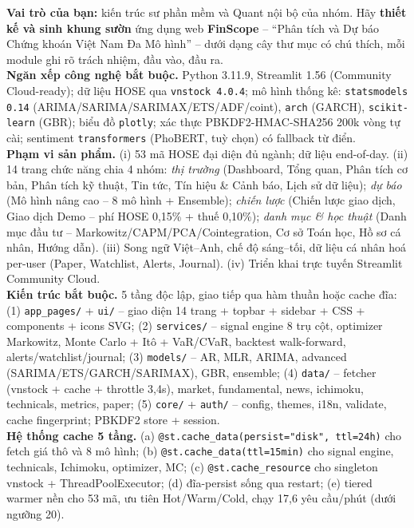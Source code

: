 \documentclass[12pt,a4paper]{article}
\begin{document}
\begin{promptbox}
\footnotesize \textbf{Vai trò của bạn:} kiến trúc sư phần mềm và Quant nội bộ của nhóm. Hãy \textbf{thiết kế và sinh khung sườn} ứng dụng web \textbf{FinScope} -- ``Phân tích và Dự báo Chứng khoán Việt Nam Đa Mô hình'' -- dưới dạng cây thư mục có chú thích, mỗi module ghi rõ trách nhiệm, đầu vào, đầu ra.\\[2pt]
\textbf{Ngăn xếp công nghệ bắt buộc.} Python 3.11.9, Streamlit 1.56 (Community Cloud-ready); dữ liệu HOSE qua \texttt{vnstock 4.0.4}; mô hình thống kê: \texttt{statsmodels 0.14} (ARIMA/SARIMA/SARIMAX/ETS/ADF/coint), \texttt{arch} (GARCH), \texttt{scikit-learn} (GBR); biểu đồ \texttt{plotly}; xác thực PBKDF2-HMAC-SHA256 200k vòng tự cài; sentiment \texttt{transformers} (PhoBERT, tuỳ chọn) có fallback từ điển.\\[2pt]
\textbf{Phạm vi sản phẩm.} (i) 53 mã HOSE đại diện đủ ngành; dữ liệu end-of-day. (ii) 14 trang chức năng chia 4 nhóm: \emph{thị trường} (Dashboard, Tổng quan, Phân tích cơ bản, Phân tích kỹ thuật, Tin tức, Tín hiệu \& Cảnh báo, Lịch sử dữ liệu); \emph{dự báo} (Mô hình nâng cao -- 8 mô hình + Ensemble); \emph{chiến lược} (Chiến lược giao dịch, Giao dịch Demo -- phí HOSE 0,15\% + thuế 0,10\%); \emph{danh mục \& học thuật} (Danh mục đầu tư -- Markowitz/CAPM/PCA/Cointegration, Cơ sở Toán học, Hồ sơ cá nhân, Hướng dẫn). (iii) Song ngữ Việt--Anh, chế độ sáng--tối, dữ liệu cá nhân hoá per-user (Paper, Watchlist, Alerts, Journal). (iv) Triển khai trực tuyến Streamlit Community Cloud.\\[2pt]
\textbf{Kiến trúc bắt buộc.} 5 tầng độc lập, giao tiếp qua hàm thuần hoặc cache đĩa: (1) \texttt{app\_pages/} + \texttt{ui/} -- giao diện 14 trang + topbar + sidebar + CSS + components + icons SVG; (2) \texttt{services/} -- signal engine 8 trụ cột, optimizer Markowitz, Monte Carlo + Itô + VaR/CVaR, backtest walk-forward, alerts/watchlist/journal; (3) \texttt{models/} -- AR, MLR, ARIMA, advanced (SARIMA/ETS/GARCH/SARIMAX), GBR, ensemble; (4) \texttt{data/} -- fetcher (vnstock + cache + throttle 3,4s), market, fundamental, news, ichimoku, technicals, metrics, paper; (5) \texttt{core/} + \texttt{auth/} -- config, themes, i18n, validate, cache fingerprint; PBKDF2 store + session.\\[2pt]
\textbf{Hệ thống cache 5 tầng.} (a) \texttt{@st.cache\_data(persist="disk", ttl=24h)} cho fetch giá thô và 8 mô hình; (b) \texttt{@st.cache\_data(ttl=15min)} cho signal engine, technicals, Ichimoku, optimizer, MC; (c) \texttt{@st.cache\_resource} cho singleton vnstock + ThreadPoolExecutor; (d) đĩa-persist sống qua restart; (e) tiered warmer nền cho 53 mã, ưu tiên Hot/Warm/Cold, chạy 17,6 yêu cầu/phút (dưới ngưỡng 20).\\[2pt]

\end{promptbox}
\end{document}
